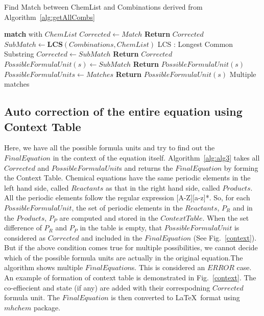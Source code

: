 \documentclass[oneside,a4paper,12pt]{book}
\begin{document}
\begin{algorithm}[!htb]
\large
\caption{Find Match between ChemList and Combinations derived from Algorithm~\ref{alg:getAllCombs}}
\begin{algorithmic}[1]
		\State \textbf{match} {with $ChemList$}
	\EndFor
		\State $Corrected \leftarrow Match$
		\State  \textbf{Return} {$Corrected$}
		\State $SubMatch \leftarrow \textbf{LCS}(Combinations,ChemList)$ 
		\Statex \Comment LCS : Longest Common Substring
			\State $Corrected \leftarrow SubMatch$
			\State  \textbf{Return} {$Corrected$}
		\Else
			\State $PossibleFormulaUnit(s) \leftarrow SubMatch$
			\State  \textbf{Return} {$PossibleFormulaUnit(s)$}
		\EndIf
	\Else
		\State $PossibleFormulaUnits \leftarrow Matches$
		\State  \textbf{Return} {$PossibleFormulaUnit(s)$}
		\Statex \Comment Multiple matches
	\EndIf
\EndProcedure
\end{algorithmic}
\label{alg:findMatch}
\end{algorithm}


\subsection{Auto correction of the entire equation using Context Table}

Here, we have all the possible formula units and try to find out the $FinalEquation$ in the context of the equation itself. Algorithm~\ref{alg:alg3} takes all $Corrected$ and $PossibleFormulaUnit$s and returns the $FinalEquation$ by forming the Context Table. 
Chemical equations have the same periodic elements in the left hand side, called $Reactants$ as that in the right hand side, called $Products$. All the periodic elements follow the regular expression [A-Z][a-z]*. So, for each  $PossibleFormulaUnit$, the set of periodic elements in the $Reactants$, $P_{R}$ and in the $Products$, $P_{P}$ are computed and stored in the $Context Table$. When the set difference of $P_{R}$ and $P_{P}$ in the table is empty, that $PossibleFormulaUnit$ is considered as $Corrected$ and included in the $FinalEquation$ (See Fig.~\ref{context}). But if the above condition comes true for multiple possibilities, we cannot decide which of the possible formula units are actually in the original equation.The algorithm shows multiple $FinalEquation$s. This is considered an $ERROR$ case.
An example of formation of context table is demonstrated in  Fig.~\ref{context}. The co-effiecient and state (if any) are added with their correspodning $Corrected$ formula unit. The $FinalEquation$ is then converted to \LaTeX\  format using $mhchem$ package.
\end{document}
